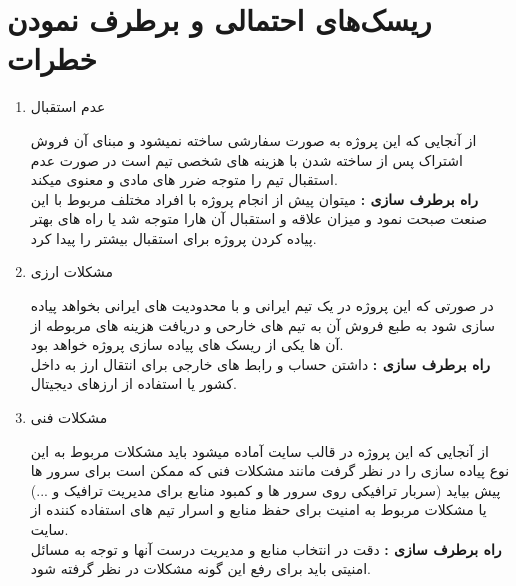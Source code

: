 \documentclass[10pt,a4paper]{article}
\begin{document}
\section{
ریسک‌های احتمالی و برطرف نمودن خطرات
}	

\begin{enumerate}
	\item 
	{
\large
عدم استقبال	

}
	از آنجایی که این پروژه به صورت سفارشی ساخته نمیشود و مبنای آن فروش اشتراک پس از ساخته شدن با هزینه های شخصی تیم است در صورت عدم استقبال تیم را متوجه ضرر های مادی و معنوی میکند. \\
	\textbf{راه برطرف سازی : }
	میتوان پیش از انجام پروژه با افراد مختلف مربوط با این صنعت صبحت نمود و میزان علاقه و استقبال آن هارا متوجه شد یا راه های بهتر پیاده کردن پروژه برای استقبال بیشتر را پیدا کرد.
	\item
	{
\large
مشکلات ارزی	

}
در صورتی که این پروژه در یک تیم ایرانی و با محدودیت های ایرانی بخواهد پیاده سازی شود به طبع فروش آن به تیم های خارحی و دریافت هزینه های مربوطه از آن ها یکی از ریسک های پیاده سازی پروژه خواهد بود.
\\
\textbf{راه برطرف سازی :} 
داشتن حساب و رابط های خارجی برای انتقال ارز به داخل کشور یا استفاده از ارزهای دیجیتال. 
\item
{
\large
مشکلات فنی

}
از آنجایی که این پروژه در قالب سایت آماده میشود باید مشکلات مربوط به این نوع پیاده سازی را در نظر گرفت مانند مشکلات فنی که ممکن است برای سرور ها پیش بیاید (سربار ترافیکی روی سرور ها و کمبود منابع برای مدیریت ترافیک و ...) یا مشکلات مربوط به امنیت برای حفظ منابع و اسرار تیم های استفاده کننده از سایت.\\
\textbf{راه برطرف سازی :}
دقت در انتخاب منابع و مدیریت درست آنها و توجه به مسائل امنیتی باید برای رفع این گونه مشکلات در نظر گرفته شود.
\end{enumerate}
\end{document}
